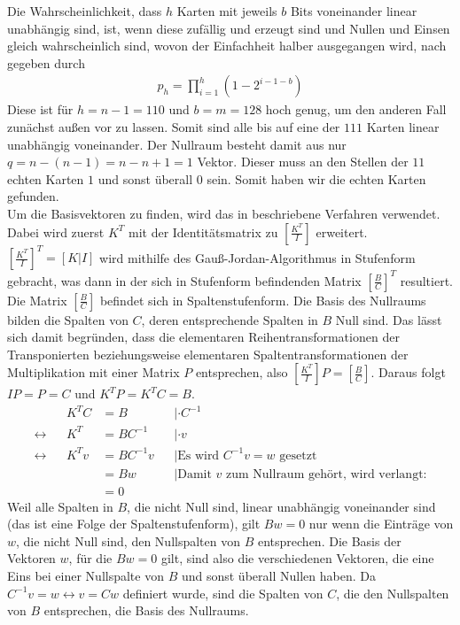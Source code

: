 \documentclass[a4paper,10pt,ngerman]{scrartcl}
\begin{document}
Die Wahrscheinlichkeit, dass $h$ Karten mit jeweils $b$ Bits voneinander linear unabhängig sind, ist, wenn diese zufällig und erzeugt sind und Nullen und Einsen gleich wahrscheinlich sind, wovon der Einfachheit halber ausgegangen wird, nach \cite{WEBSITE:1} gegeben durch
\begin{align*}
p_h = \prod^h_{i=1} (1-2^{i-1-b})
\end{align*}
Diese ist für $h=n-1=110$ und $b=m=128$ hoch genug, um den anderen Fall zunächst außen vor zu lassen. Somit sind alle bis auf eine der $111$ Karten linear unabhängig voneinander. Der Nullraum besteht damit aus nur $q=n-(n-1)=n-n+1=1$ Vektor. Dieser muss an den Stellen der $11$ echten Karten $1$ und sonst überall $0$ sein. Somit haben wir die echten Karten gefunden. \\
Um die Basisvektoren zu finden, wird das in \cite{WEBSITE:2} beschriebene Verfahren verwendet. Dabei wird zuerst $K^T$ mit der Identitätsmatrix zu $\left[\frac{K^T}{I}\right]$ erweitert. $\left[\frac{K^T}{I}\right]^T=[K|I]$ wird mithilfe des Gauß-Jordan-Algorithmus in Stufenform gebracht, was dann in der sich in Stufenform befindenden Matrix $\left[\frac{B}{C}\right]^T$ resultiert. Die Matrix $\left[\frac{B}{C}\right]$ befindet sich in Spaltenstufenform. Die Basis des Nullraums bilden die Spalten von $C$, deren entsprechende Spalten in $B$ Null sind. Das lässt sich damit begründen, dass die elementaren Reihentransformationen der Transponierten beziehungsweise elementaren Spaltentransformationen der Multiplikation mit einer Matrix $P$ entsprechen, also $\left[\frac{K^T}{I}\right] P = \left[\frac{B}{C}\right]$. Daraus folgt $I P = P = C$ und $K^T P = K^T C = B$.
\begin{align*}
&& K^T C &= B  &&|\cdot C^{-1}\\
\leftrightarrow && K^T &= BC^{-1} &&|\cdot v \\
\leftrightarrow && K^T v &= BC^{-1} v && | \text{Es wird $C^{-1}v = w$ gesetzt}\\
&& &= Bw && | \text{Damit $v$ zum Nullraum gehört, wird verlangt:}\\
&& &= 0 
\end{align*}
Weil alle Spalten in $B$, die nicht Null sind, linear unabhängig voneinander sind (das ist eine Folge der Spaltenstufenform), gilt $Bw=0$ nur wenn die Einträge von $w$, die nicht Null sind, den Nullspalten von $B$ entsprechen. Die Basis der Vektoren $w$, für die $Bw=0$ gilt, sind also die verschiedenen Vektoren, die eine Eins bei einer Nullspalte von $B$ und sonst überall Nullen haben. Da $C^{-1} v = w \leftrightarrow v = C w$ definiert wurde, sind die Spalten von $C$, die den Nullspalten von $B$ entsprechen, die Basis des Nullraums. \\
\end{document}

